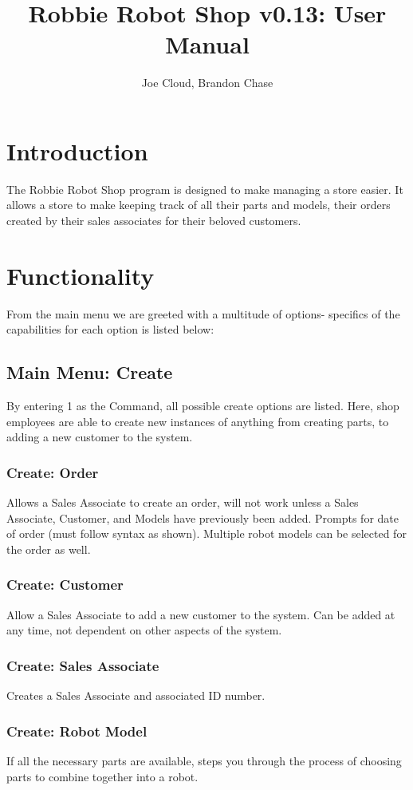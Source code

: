 \documentclass{article}
\title{Robbie Robot Shop v0.13: User Manual}
\author{Joe Cloud, Brandon Chase}
\begin{document}
\maketitle 

\section{Introduction}

The Robbie Robot Shop program is designed to make managing a store easier. It allows a store to make keeping track of all their parts and models, their orders created by their sales associates for their beloved customers. 

\section{Functionality}
From the main menu we are greeted with a multitude of options- specifics of the capabilities for each option is listed below:
\subsection{Main Menu: Create}
By entering 1 as the Command, all possible create options are listed. Here, shop employees are able to create new instances of anything from creating parts, to adding a new customer to the system.
\subsubsection{Create: Order}
Allows a Sales Associate to create an order, will not work unless a Sales Associate, Customer, and Models have previously been added.
Prompts for date of order (must follow syntax as shown). Multiple robot models can be selected for the order as well.
\subsubsection{Create: Customer}
Allow a Sales Associate to add a new customer to the system.
Can be added at any time, not dependent on other aspects of the system.
\subsubsection{Create: Sales Associate}
Creates a Sales Associate and associated ID number.
\subsubsection{Create: Robot Model}
If all the necessary parts are available, steps you through the process of choosing parts to combine together into a robot.
\end{document}
